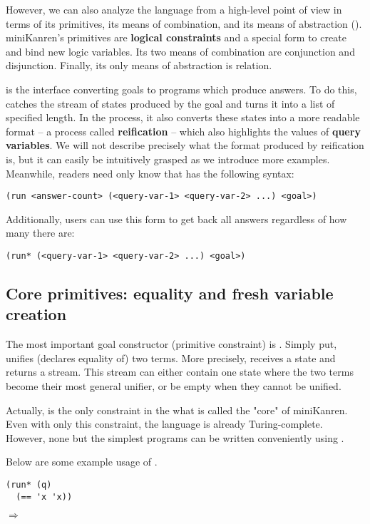 However, we can also analyze the language from a high-level point of view in terms of its primitives, its means of combination, and its means of abstraction (\cite[359]{sicp}). miniKanren's primitives are \textbf{logical constraints} and a special form to create and bind new logic variables. Its two means of combination are conjunction and disjunction. Finally, its only means of abstraction is relation.

 is the interface converting goals to programs which produce answers. To do this,  catches the stream of states produced by the goal and turns it into a list of specified length. In the process, it also converts these states into a more readable format -- a process called \textbf{reification} -- which also highlights the values of \textbf{query variables}. We will not describe precisely what the format produced by reification is, but it can easily be intuitively grasped as we introduce more examples. Meanwhile, readers need only know that  has the following syntax:
\lstset{language=Scheme, showstringspaces=false, breaklines=true}
\begin{lstlisting}
(run <answer-count> (<query-var-1> <query-var-2> ...) <goal>)
\end{lstlisting}

Additionally, users can use this form to get back all answers regardless of how many there are:
\begin{lstlisting}
(run* (<query-var-1> <query-var-2> ...) <goal>)
\end{lstlisting}

\subsection{Core primitives: equality and fresh variable creation}
The most important goal constructor (primitive constraint) is \code{==}.
Simply put, \code{==} unifies (declares equality of) two terms. More precisely, \code{==} receives a state and returns a stream. This stream can either contain one state where the two terms become their most general unifier, or be empty when they cannot be unified.

Actually, \code{==} is the only constraint in the what is called the "core" of miniKanren. Even with only this constraint, the language is already Turing-complete. However, none but the simplest programs can be written conveniently using \code{==}.

Below are some example usage of \code{==}.
\begin{lstlisting}
(run* (q)
  (== 'x 'x))
\end{lstlisting}
$\Rightarrow$ 

